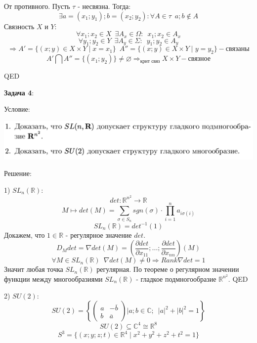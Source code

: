 \documentclass[12pt]{article}
\begin{document}
\begin{large}
\par От противного. Пусть $\tau$ - несвязна. Тогда:
\[
    \exists a = (x_1; y_1); b = (x_2; y_2) : \forall A \in \tau \, \, \, a; b \notin A
\]
Связность $X$ и $Y$:
\[
    \forall x_1; x_2 \in X \, \, \,  \exists A_x \in \Omega : \, \, \, x_1; x_2 \in A_x
\]
\[
    \forall y_1; y_2 \in Y \, \, \,  \exists A_y \in \varSigma : \, \, \, y_1; y_2 \in A_y
\]
\[
    \Rightarrow A' = \{ (x;y) \in X \times Y \mid x = x_1\} \, \, \, A'' = \{ (x;y) \in X \times Y \mid y = y_2\} - \text{связаны}
\]
\[
    A' \bigcap A'' = \{(x_1; y_2)\} \neq \varnothing \Rightarrow_{\text{крит связ}} X \times Y - \text{связное} %
\]
\par QED
\par \textbf{Задача 4}:
\par Условие:
\par
\includegraphics[width=1\textwidth]{photo_4.png}
\par Решение:
\par 1) $SL_n(\mathbb{R})$:
\[
    det : \mathbb{R}^{n^2} \longrightarrow \mathbb{R}
\]
\[
    M \longmapsto det(M) = \sum\limits_{\sigma \in S_n} sgn (\sigma) \cdot \prod\limits_{i = 1}^n a_{i \sigma(i)}
\]
\[
    SL_n(\mathbb{R}) = det^{-1}(1)
\]
Докажем, что $1 \in \mathbb{R}$ - регулярное значение $det$.
\[
    D_{M}det = \nabla det(M) = \left( \frac{\partial det}{\partial x_{11}}; \dotso; \frac{\partial det}{\partial x_{nn}}  \right)(M)
\]
\[
    \forall M \in SL_n(\mathbb{R}) \, \, \,  \nabla det(M) \neq 0 \Rightarrow Rank \nabla det = 1
\]
Значит любая точка $SL_n(\mathbb{R})$ регулярная. По теореме о регулярном значении функции между многообразиями $SL_n(\mathbb{R})$ - гладкое подмногообразие $\mathbb{R}^{n^2}$. QED
\par 2) $SU(2)$:
\begin{equation*}
    SU(2)
    = \left\{
    \begin{pmatrix}
        a & -\overline{b}\\
        b & \overline{a}
    \end{pmatrix}
    \Bigg| a; b \in \mathbb{C}; \,\,\, |a|^2 + |b|^2 = 1
    \right\}
\end{equation*}
\[
    SU(2) \subseteq \mathbb{C}^4 \cong \mathbb{R}^8
\]
\[
    S^3 = \{ (x; y; z; t) \in \mathbb{R}^4 \mid x^2 + y^2 + z^2 + t^2 = 1 \}
\]
\end{large}
\end{document}
